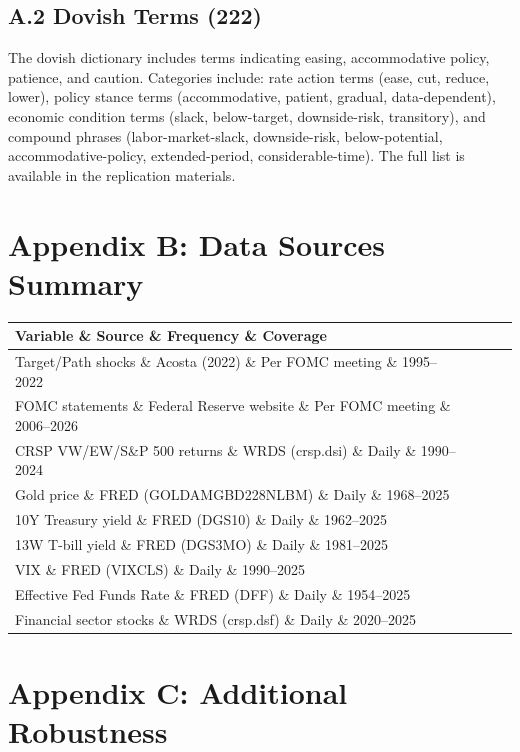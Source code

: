 \documentclass[12pt]{article}
\begin{document}
\subsection{A.2 Dovish Terms (222)}

The dovish dictionary includes terms indicating easing, accommodative policy, patience, and caution. Categories include: rate action terms (ease, cut, reduce, lower), policy stance terms (accommodative, patient, gradual, data-dependent), economic condition terms (slack, below-target, downside-risk, transitory), and compound phrases (labor-market-slack, downside-risk, below-potential, accommodative-policy, extended-period, considerable-time). The full list is available in the replication materials.


\section{Appendix B: Data Sources Summary}

\begin{table}[htbp]
\centering
\begin{tabular}{lccc}
\toprule
Variable \& Source \& Frequency \& Coverage \\
\midrule
Target/Path shocks \& Acosta (2022) \& Per FOMC meeting \& 1995--2022 \\
FOMC statements \& Federal Reserve website \& Per FOMC meeting \& 2006--2026 \\
CRSP VW/EW/S\&P 500 returns \& WRDS (crsp.dsi) \& Daily \& 1990--2024 \\
Gold price \& FRED (GOLDAMGBD228NLBM) \& Daily \& 1968--2025 \\
10Y Treasury yield \& FRED (DGS10) \& Daily \& 1962--2025 \\
13W T-bill yield \& FRED (DGS3MO) \& Daily \& 1981--2025 \\
VIX \& FRED (VIXCLS) \& Daily \& 1990--2025 \\
Effective Fed Funds Rate \& FRED (DFF) \& Daily \& 1954--2025 \\
Financial sector stocks \& WRDS (crsp.dsf) \& Daily \& 2020--2025 \\
\bottomrule
\end{tabular}
\end{table}


\section{Appendix C: Additional Robustness}
\end{document}
